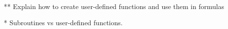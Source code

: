 \documentclass[12pt]{article}%
\begin{document}
\begin{itemize}
 \item[**] Explain how to create user-defined functions and use them in formulas
\item[*] Subroutines vs user-defined functions.
\end{itemize}
\end{document}
